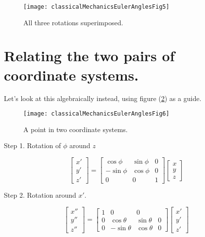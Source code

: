 \begin{figure}[htp]
   \centering
   \texttt{[image: classicalMechanicsEulerAnglesFig5]}
   \caption{All three rotations superimposed.}\label{fig:classicalMechanicsEulerAngles:classicalMechanicsEulerAnglesFig5}
\end{figure}

\section{Relating the two pairs of coordinate systems.}

Let's look at this algebraically instead, using figure (\ref{fig:classicalMechanicsEulerAngles:classicalMechanicsEulerAnglesFig6}) as a guide.

\begin{figure}[htp]
   \centering
   \texttt{[image: classicalMechanicsEulerAnglesFig6]}
   \caption{A point in two coordinate systems.}\label{fig:classicalMechanicsEulerAngles:classicalMechanicsEulerAnglesFig6}
\end{figure}

Step 1.  Rotation of $\phi$ around $z$

\begin{equation}\label{eqn:classicalMechanicsEulerAngles:20}
\begin{bmatrix}
x' \\
y' \\
z'
\end{bmatrix}
=
\begin{bmatrix}
\cos\phi & \sin\phi & 0 \\
-\sin\phi & \cos\phi & 0 \\
0 & 0 & 1
\end{bmatrix}
\begin{bmatrix}
x \\
y \\
z
\end{bmatrix}
\end{equation}

Step 2.  Rotation around $x'$.

\begin{equation}\label{eqn:classicalMechanicsEulerAngles:40}
\begin{bmatrix}
x'' \\
y'' \\
z''
\end{bmatrix}
=
\begin{bmatrix}
1 & 0 & 0 \\
0 & \cos\theta & \sin\theta & 0 \\
0 & -\sin\theta & \cos\theta & 0 
\end{bmatrix}
\begin{bmatrix}
x' \\
y' \\
z'
\end{bmatrix}
\end{equation}

